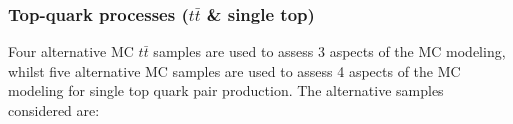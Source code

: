  
 
 
 
 
\subsubsection{Top-quark processes ($t \bar{t}$ \& single top) }
\label{sec:boosted_syst_modeling_top}
 
Four alternative MC $t \bar{t}$ samples are used to assess 3 aspects of the MC modeling,
whilst five alternative MC samples are used to assess 4 aspects of the MC modeling for
single top quark pair production. The alternative samples considered are:
 
